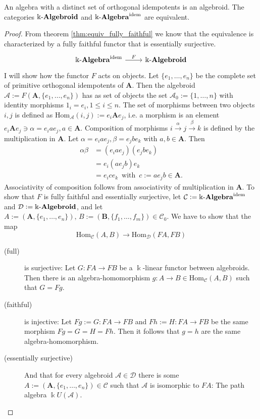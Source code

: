 \begin{proposition}
An algebra with a distinct set of orthogonal idempotents is an algebroid. The categories $\Bbbk\textnormal{-}\mathbf{Algebroid}$ and
$\Bbbk\textnormal{-}\mathbf{Algebra}^{\text{idem}}$ are equivalent.
\end{proposition}
\begin{proof}
From theorem \ref{thm:equiv_fully_faithful} we know that the equivalence is characterized by a fully faithful functor that is essentially surjective.
\[
\begin{tikzcd}
\Bbbk\textnormal{-}\mathbf{Algebra}^{\text{idem}} \arrow[r, "F"] & \Bbbk\textnormal{-}\mathbf{Algebroid}
\end{tikzcd}
\]
I will show how the functor $F$ acts on objects.
Let $\{e_{1},\dots,e_{n}\}$ be the complete set of primitive orthogonal idempotents of $\mathbf{A}$. Then the algebroid
$\mathcal{A} := F(\mathbf{A},\{e_{1},\dots,e_{n}\})$ has
as set of objects the set $\mathcal{A}_{0} := \{1,\dots,n\}$ with identity morphisms $1_{i} = e_{i}, 1\leq i \leq n$. The set of morphisms between
two objects $i,j$ is defined as $\mathrm{Hom}_{\mathcal{A}}(i,j) := e_{i}\mathbf{A}e_{j}$, i.e. a morphism is an element
$e_{i}\mathbf{A}e_{j} \ni \alpha = e_{i}ae_{j}, a\in \mathbf{A}$.
Composition of morphisms $i \xrightarrow{\alpha} j \xrightarrow{\beta} k$ is defined by the multiplication in $\mathbf{A}$.
Let $\alpha = e_{i}ae_{j}, \beta = e_{j}be_{k}$ with $a, b\in \mathbf{A}$. Then
\begin{align}
\alpha \beta &= (e_{i}ae_{j})(e_{j}be_{k}) \\
&= e_{i}(ae_{j}b)e_{k} \\
&= e_{i}ce_{k}\,\text{ with }\, c := ae_{j}b \in \mathbf{A}.
\end{align}
Associativity of composition follows from associativity of multiplication in $\mathbf{A}$.
To show that $F$ is fully faithful and essentially surjective, let $\mathcal{C} := \Bbbk\textnormal{-}\mathbf{Algebra}^{\text{idem}}$ and
$\mathcal{D} := \Bbbk\textnormal{-}\mathbf{Algebroid}$, and let $A := (\mathbf{A},\{e_{1},\dots,e_{n}\}),\, B := (\mathbf{B},\{f_{1},\dots,f_{m}\}) \in \mathcal{C}_{0}$. We have to show that the map
\[
\mathrm{Hom}_{\mathcal{C}}(A,B) \rightarrow \mathrm{Hom}_{\mathcal{D}}(FA,FB)
\]
\begin{description}
\item[(full)] is surjective: Let $G : FA \rightarrow FB$ be a $\Bbbk$-linear functor between algebroids. Then there is an algebra-homomorphism
$g : A \rightarrow B \in \mathrm{Hom}_{\mathcal{C}}(A,B)$ such that $G = Fg$.
\item[(faithful)] is injective: Let $Fg := G : FA \rightarrow FB$ and $Fh := H : FA \rightarrow FB$ be the same morphism $Fg = G = H = Fh$.
Then it follows that $g = h$ are the same algebra-homomorphism.
\item[(essentially surjective)] And that for every algebroid $\mathcal{A} \in \mathcal{D}$ there is some
$A := (\mathbf{A},\{e_{1},\dots,e_{n}\}) \in \mathcal{C}$ such that $\mathcal{A}$ is isomorphic to $FA$: 
The path algebra $\Bbbk U(\mathcal{A})$.
\end{description}
\end{proof}





